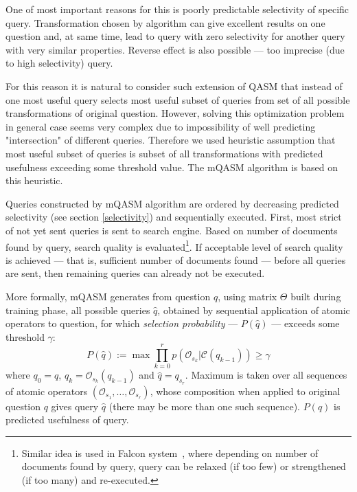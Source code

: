 \documentclass{article}
\begin{document}
One of most important reasons for this is poorly predictable selectivity
of specific query.
Transformation chosen by algorithm
can give excellent results on
one question and, at same time, lead to query with zero
selectivity for another query with very similar properties.
Reverse effect is also possible --- too imprecise (due to high selectivity) query.

For this reason it is natural to consider such extension of QASM
that instead of one most useful query
selects most useful subset of queries from
set of all possible transformations of original question.
However, solving this optimization problem in general case seems very
complex due to impossibility of well predicting "intersection" of different queries.
Therefore we used heuristic assumption that
most useful subset of queries is subset of all transformations
with predicted usefulness exceeding some threshold value.
The mQASM algorithm is based on this heuristic.

Queries constructed by mQASM algorithm
are ordered by decreasing predicted selectivity (see section \ref{selectivity})
and sequentially executed.
First, most strict of not yet sent queries is sent to search engine.
Based on number of documents found by query, search quality is evaluated\footnote{
Similar idea is used in Falcon system~\cite{qa:Harabagiu},
where depending on number of documents found by query,
query can be relaxed (if too few)
or strengthened (if too many) and re-executed.}.
If acceptable level of search quality is achieved --- that is, sufficient number of documents found ---
before all queries are sent, then
remaining queries can already not be executed.

More formally, mQASM generates from question $q$,
using matrix $\Theta$ built during training phase,
all possible queries $\hat{q}$,
obtained by sequential application of atomic operators
to question,
for which {\em selection probability} --- $P(\hat{q})$ ---
exceeds some threshold $\gamma$:
\begin{equation}\label{eq:pdef}
P(\hat{q}):=\max \prod_{k=0}^r p(\mathcal{O}_{s_k}|\mathcal{C}(q_{k-1})) \geq \gamma
\end{equation}
where $q_0 = q$, $q_{k}=\mathcal{O}_{s_k}(q_{k-1})$ and $\hat{q}=q_{s_r}$.
Maximum is taken over all sequences of atomic operators
$(\mathcal{O}_{s_1},\ldots,\mathcal{O}_{s_r})$,
whose composition when applied to original question $q$
gives query $\hat{q}$ (there may be more than
one such sequence).
$P(q)$ is predicted usefulness of query.
\end{document}
